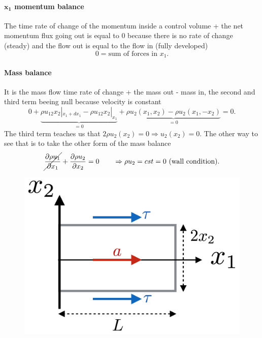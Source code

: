 		\paragraph{$\mathbf{x_1}$ momentum balance}
			The time rate of change of the momentum inside a control volume + the net momentum flux going out is equal to 0 because there is no rate of change (steady) and the flow out is equal to the flow in (fully developed) 
			\begin{equation}
				0 = \mbox{sum of forces in } x_1.
			\end{equation}			 
		
		\paragraph{Mass balance} 
		It is the mass flow time rate of change + the mass out - mass in, the second and third term beeing null because velocity is constant
		\begin{equation}
			0 + \underbrace{\rho u_12x_2 |_{x_1+dx_1}- \rho u_12x_2 |_{x_1} }_{= 0} + \underbrace{\rho u_2 (x_1,x_2) -\rho u_2 (x_1,-x_2)}_{= 0} = 0.
		\end{equation}
		The third term teaches us that $2 \rho u_2(x_2)= 0 \Rightarrow u_2(x_2) = 0$. The other way to see that is to take the other form of the mass balance 
		\begin{equation}
			\cancel{\frac{\partial\rho u_1}{\partial x_1}}+\frac{\partial\rho u_2}{\partial x_2} = 0\qquad \Rightarrow \rho u_2 = cst = 0 \mbox{ (wall condition)}. 
		\end{equation}
		
		\begin{figure}
		\vspace{-15mm}
		\includegraphics[scale=0.25]{ch4/2}
		\end{figure}
